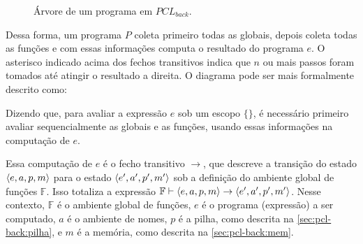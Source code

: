 \begin{figure*}[ht]
	\centering
	\caption{Árvore de um programa em $PCL_{back}$.}
	\label{fig:tree-structure}
\end{figure*}

Dessa forma, um programa $P$ coleta primeiro todas as globais, depois coleta todas as funções e com essas informações computa o resultado do programa $e$. O asterisco indicado acima dos fechos transitivos indica que $n$ ou mais passos foram tomados até atingir o resultado a direita. O diagrama pode ser mais formalmente descrito como:

\noindent Dizendo que, para avaliar a expressão $e$ sob um escopo $\{\}$, é necessário primeiro avaliar sequencialmente as globais e as funções, usando essas informações na computação de $e$.

Essa computação de $e$ é o fecho transitivo $\to$, que descreve a transição do estado $\langle e, a, p, m \rangle$ para o estado $\langle e', a', p', m' \rangle$ sob a definição do ambiente global de funções $\mathbb{F}$. Isso totaliza a expressão $\mathbb{F} \vdash \langle e, a, p, m \rangle \to \langle e', a', p', m' \rangle$. Nesse contexto, $\mathbb{F}$ é o ambiente global de funções, $e$ é o programa (expressão) a ser computado, $a$ é o ambiente de nomes, $p$ é a pilha, como descrita na \autoref{sec:pcl-back:pilha}, e $m$ é a memória, como descrita na \autoref{sec:pcl-back:mem}.

